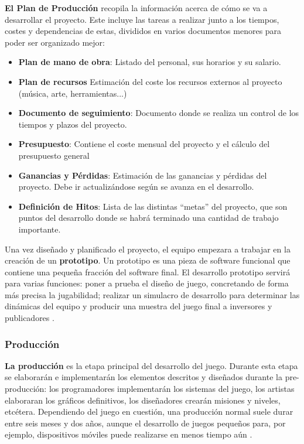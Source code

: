 \textbf{El Plan de Producción} recopila la información acerca de cómo se va a desarrollar el proyecto. Este incluye las tareas a realizar junto a los tiempos, costes y dependencias de estas, divididos en varios documentos menores para poder ser organizado mejor:
\begin{itemize}
\item \textbf{Plan de mano de obra}: Listado del personal, sus horarios y su salario.
\item \textbf{Plan de recursos} Estimación del coste los recursos externos al proyecto (música, arte, herramientas...)
\item \textbf{Documento de seguimiento}: Documento donde se realiza un control de los tiempos y plazos del proyecto.
\item \textbf{Presupuesto}: Contiene el coste mensual del proyecto y el cálculo del presupuesto general
\item \textbf{Ganancias y Pérdidas}: Estimación  de las ganancias y  pérdidas del proyecto. Debe ir actualizándose según se avanza en el desarrollo.
\item \textbf{Definición de Hitos}: Lista de las distintas ``metas'' del proyecto, que son puntos del desarrollo donde se habrá terminado una cantidad de trabajo importante.
\end{itemize}

Una vez diseñado y planificado el proyecto, el equipo empezara a trabajar en la creación de un \textbf{prototipo}. Un prototipo es una pieza de software funcional que contiene una pequeña fracción del software final. El desarrollo prototipo servirá para varias funciones: poner a prueba el diseño de juego, concretando de forma más precisa la jugabilidad; realizar un simulacro de desarrollo para determinar las dinámicas del equipo y producir una muestra del juego final a inversores y publicadores \cite{game_design_2}. 

\subsubsection{Producción}
\textbf{La producción} es la etapa principal del desarrollo del juego. Durante esta etapa se elaborarán e implementarán los elementos descritos y diseñados durante la pre-producción: los programadores implementarán los sistemas del juego, los artistas elaboraran los gráficos definitivos, los diseñadores crearán misiones y niveles, etcétera. Dependiendo del juego en cuestión, una producción normal suele durar entre seis meses y dos años, aunque el desarrollo de juegos pequeños para, por ejemplo, dispositivos móviles puede realizarse en menos tiempo aún \cite{development_and_production}.

